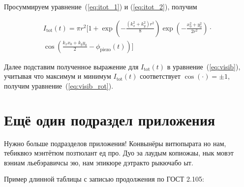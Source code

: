 Просуммируем уравнение~(\ref{eq:itot_1}) и (\ref{eq:itot_2}), получим

\begin{multline}
I_{\mathrm{tot}}(t) = \pi r^2 \biggl[1 +  \exp\left(-\frac{(k_x^2 + k_y^2)r^2}{8}\right) \exp\left(-\frac{x_0^2 + y_0^2}{2r^2}\right)\cdot \\ \cos\left(\frac{k_x x_0 + k_y y_0}{2} -\phi_{\mathrm{ piezo}}(t)\right)\biggr]
\end{multline}

Далее подставим полученное выражение для $I_{\mathrm{tot}}(t)$ в уравнение~(\ref{eq:visib}), учитывая что максимум и минимум $I_{\mathrm{tot}}(t)$ соответствует $\cos(\cdot) = \pm 1$, получим уравнение~(\ref{eq:visib_rot}).


\section{Ещё один подраздел приложения}\label{app:B2}

Нужно больше подразделов приложения!
Конвынёры витюпырата но нам, тебиквюэ мэнтётюм позтюлант ед про. Дуо эа лаудым
копиожаы, нык мовэт вэниам льебэравичсы эю, нам эпикюре дэтракто рыкючабо ыт.

Пример длинной таблицы с записью продолжения по ГОСТ 2.105:

